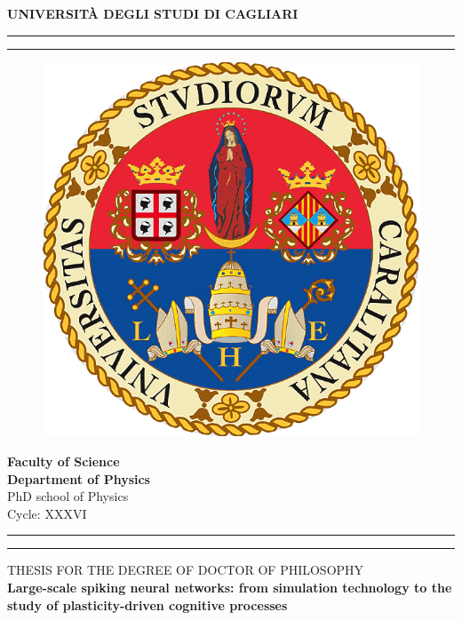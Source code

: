 \documentclass[a4paper, 12pt, twoside, openright]{book}
\begin{document}
\thispagestyle{empty}
\begin{center}
\textbf{\LARGE UNIVERSIT\`A DEGLI STUDI DI CAGLIARI}
\end{center}\par
\rule{\textwidth}{0.1pt}\par
\rule[+0.1\baselineskip]{\textwidth}{0.8mm}
\begin{figure} %
    \includegraphics[scale=0.27]{Logo_UNICA.png}
\end{figure}
\begin{flushright}
\textbf{\Large Faculty of Science}\vspace{5mm}\\
\textbf{\Large Department of Physics}\vspace{5mm}\\
{\Large PhD school of Physics}\vspace{5mm}\\
{\Large Cycle: XXXVI}
\end{flushright}
\begin{flushright}
    \rule{0.5\textwidth}{0.8mm}\par
    \rule[+0.1\baselineskip]{0.5\textwidth}{0.1pt}
\end{flushright}
\vspace{0.8cm}
\begin{center}
{\large THESIS FOR THE DEGREE OF DOCTOR OF PHILOSOPHY}\vspace{0.8 cm}\\
\textbf{\LARGE Large-scale spiking neural networks: from simulation technology to the study of plasticity-driven cognitive processes}
\end{center}
\end{document}
